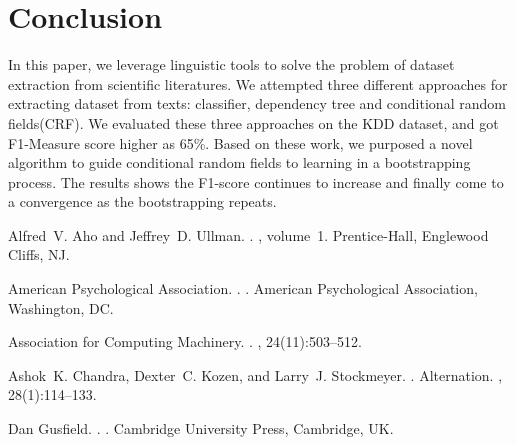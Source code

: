 \documentclass[10pt]{article}
\begin{document}
\section{Conclusion}
In this paper, we leverage linguistic tools to solve the problem of dataset extraction from scientific literatures. We attempted three different approaches for extracting dataset from texts: classifier, dependency tree and conditional random fields(CRF). We evaluated these three approaches on the KDD dataset, and got F1-Measure score higher as 65\%. Based on these work, we purposed a novel algorithm to guide conditional random fields to learning in a bootstrapping process. The results shows the F1-score continues to increase and finally come to a convergence as the bootstrapping repeats.
\begin{thebibliography}{}

Alfred~V. Aho and Jeffrey~D. Ullman.
.
, volume~1.
\newblock Prentice-{Hall}, Englewood Cliffs, NJ.

{American Psychological Association}.
.
.
\newblock American Psychological Association, Washington, DC.

{Association for Computing Machinery}.
.
, 24(11):503--512.

Ashok~K. Chandra, Dexter~C. Kozen, and Larry~J. Stockmeyer.
.
\newblock Alternation.
,
  28(1):114--133.

Dan Gusfield.
.
.
\newblock Cambridge University Press, Cambridge, UK.

\end{thebibliography}
\end{document}
